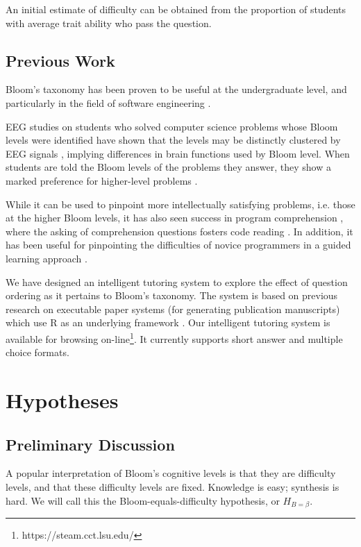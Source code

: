 \documentclass[a4paper,twocolumn]{article}
\begin{document}
An initial estimate of difficulty can be obtained from the proportion of
students with average trait ability who pass the question.


\subsection{Previous Work}

Bloom's taxonomy has been proven to be useful at the undergraduate level, and
particularly in the field of software engineering \cite{britto2015}
\cite{mahmood2014}.

EEG studies on students who solved computer science problems whose Bloom levels
were identified have shown that the levels may be distinctly clustered by EEG
signals \cite{chatterjee2015}, implying differences in brain functions used by
Bloom level.  When students are told the Bloom levels of the problems they
answer, they show a marked preference for higher-level problems
\cite{bruyn2011} \cite{goel2004}.

While it can be used to pinpoint more intellectually satisfying problems, i.e.
those at the higher Bloom levels, it has also seen success in program
comprehension \cite{buckley2003}, where the asking of comprehension questions
fosters code reading \cite{losada2008}. In addition, it has been useful for
pinpointing the difficulties of novice programmers in a guided learning
approach \cite{shuhidan2011}.

We have designed an intelligent tutoring system to explore the effect of
question ordering as it pertains to Bloom's taxonomy.  The system is based on
previous research on executable paper systems (for generating publication
manuscripts) which use R as an underlying framework \cite{castleberry2011}.
Our intelligent tutoring system is available for browsing
on-line\footnote{https://steam.cct.lsu.edu/}. It currently supports short
answer and multiple choice formats.

\section{Hypotheses}

\subsection{Preliminary Discussion}

A popular interpretation of Bloom's cognitive levels is that they are
difficulty levels, and that these difficulty levels are fixed.  Knowledge is
easy; synthesis is hard.  We will call this the Bloom-equals-difficulty
hypothesis, or $H_{B=\beta}$.
\end{document}
